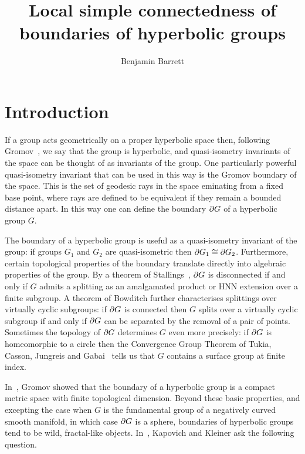 \documentclass[a4paper]{article}
\title{Local simple connectedness of boundaries of hyperbolic groups}
\author{Benjamin Barrett}
\begin{document}
\maketitle


\section{Introduction}

If a group acts geometrically on a proper hyperbolic space then, following
Gromov~\cite{gromov87}, we say that the group is hyperbolic, and quasi-isometry
invariants of the space can be thought of as invariants of the group. One
particularly powerful quasi-isometry invariant that can be used in
this way is the Gromov boundary of the space. This is the set of geodesic rays
in the space eminating from a fixed base point, where rays are defined to be
equivalent if they remain a bounded distance apart. In this way one can define
the boundary $\partial G$ of a hyperbolic group $G$.

The boundary of a hyperbolic group is useful as a quasi-isometry invariant of
the group: if groups $G_1$ and $G_2$ are quasi-isometric then $\partial G_1
\cong \partial G_2$. Furthermore, certain topological properties of the
boundary translate directly into algebraic properties of the group. By a
theorem of Stallings~\cite{stallings68}, $\partial G$ is disconnected if and
only if $G$ admits a splitting as an amalgamated product or HNN extension over
a finite subgroup. A theorem of Bowditch further characterises splittings over
virtually cyclic subgroups: if $\partial G$ is connected then $G$ splits over
a virtually cyclic subgroup if and only if $\partial G$ can be separated by
the removal of a pair of points. Sometimes the topology of $\partial G$
determines $G$ even more precisely: if $\partial G$ is homeomorphic to a
circle then the Convergence Group Theorem of Tukia, Casson, Jungreis and
Gabai~\cite{tukia88,cassonjungreis94,gabai92} tells us that $G$ contains a
surface group at finite index.

In~\cite{gromov87}, Gromov showed that the boundary of a hyperbolic group is a
compact metric space with finite topological dimension. Beyond these basic
properties, and excepting the case when $G$ is the fundamental group of a
negatively curved smooth manifold, in which case $\partial G$ is a sphere,
boundaries of hyperbolic groups tend to be wild, fractal-like objects.
In~\cite{kapovichkleiner00}, Kapovich and Kleiner ask the following question.
\end{document}
